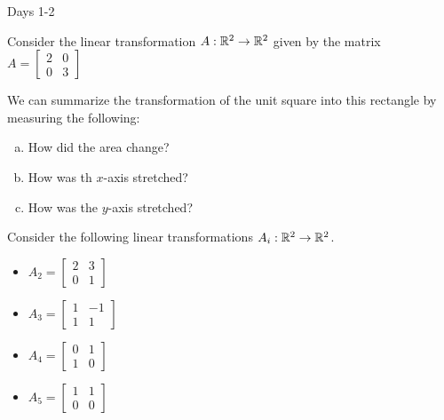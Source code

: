
\begin{applicationActivities}{Days 1-2}

\begin{activity}
Consider the linear transformation $A : \mathbb{R}^2 \rightarrow \mathbb{R}^2$ given by the matrix $A = \begin{bmatrix} 2 & 0 \\ 0 & 3 \end{bmatrix}$

\begin{center}
\end{center}

We can summarize the transformation of the unit square into this rectangle by measuring the following:

\begin{enumerate}[(a)]
\item How did the area change?
\item How was th $x$-axis stretched?
\item How was the $y$-axis stretched?
\end{enumerate}

\end{activity}


\begin{activity}
Consider the following linear transformations  $A_i: \mathbb{R}^2 \rightarrow \mathbb{R}^2$.
\begin{itemize}
\item $A_2 = \begin{bmatrix} 2 & 3 \\ 0 & 1 \end{bmatrix}$
\item $A_3 = \begin{bmatrix} 1 & -1 \\ 1 & 1 \end{bmatrix}$
\item $A_4 = \begin{bmatrix} 0 & 1 \\ 1 & 0 \end{bmatrix}$
\item $A_5 = \begin{bmatrix} 1 & 1 \\ 0 & 0 \end{bmatrix}$
\end{itemize}


\end{activity}
\end{applicationActivities}

